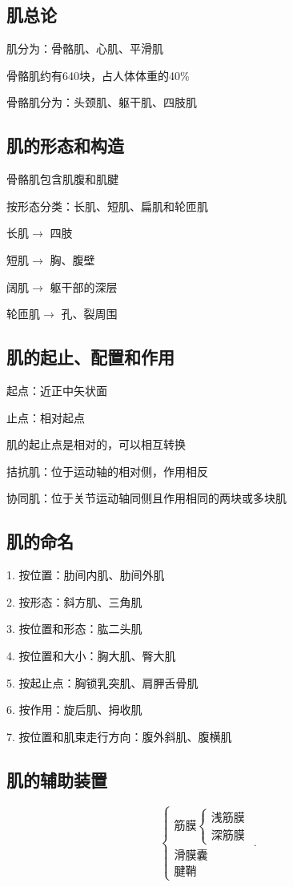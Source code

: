\subsection{肌总论}%
\label{sub:肌总论}
肌分为：骨骼肌、心肌、平滑肌

骨骼肌约有640块，占人体体重的40\%

骨骼肌分为：头颈肌、躯干肌、四肢肌
\subsection{肌的形态和构造}%
\label{sub:肌的形态和构造}
\begin{notation}
	骨骼肌包含肌腹和肌腱
\end{notation}
按形态分类：长肌、短肌、扁肌和轮匝肌

长肌$\to $ 四肢

短肌$\to $ 胸、腹壁

阔肌$\to $ 躯干部的深层

轮匝肌$\to $ 孔、裂周围
\subsection{肌的起止、配置和作用}%
\label{sub:肌的起止、配置和作用}
起点：近正中矢状面

止点：相对起点
\begin{notation}
	肌的起止点是相对的，可以相互转换
\end{notation}
拮抗肌：位于运动轴的相对侧，作用相反

协同肌：位于关节运动轴同侧且作用相同的两块或多块肌
\subsection{肌的命名}%
\label{sub:肌的命名}
1. 按位置：肋间内肌、肋间外肌

2. 按形态：斜方肌、三角肌

3. 按位置和形态：肱二头肌

4. 按位置和大小：胸大肌、臀大肌

5. 按起止点：胸锁乳突肌、肩胛舌骨肌

6. 按作用：旋后肌、拇收肌

7. 按位置和肌束走行方向：腹外斜肌、腹横肌
\subsection{肌的辅助装置}%
\label{sub:肌的辅助装置}
\[
	\begin{cases}
		\text{筋膜}\begin{cases}
			\text{浅筋膜}\\
			\text{深筋膜}
		\end{cases}\\
		\text{滑膜囊}\\
		\text{腱鞘}
	\end{cases}
.\] 
